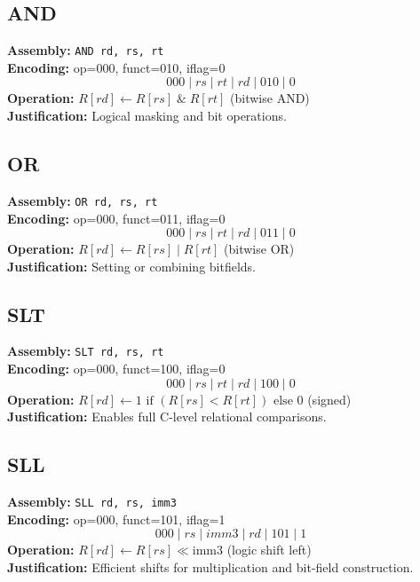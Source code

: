 \documentclass[12pt]{report}
\begin{document}
\subsection*{AND}
\textbf{Assembly:} \texttt{AND rd, rs, rt} \\
\textbf{Encoding:} op=000, funct=010, iflag=0 
\[
000 \;|\; rs \;|\; rt \;|\; rd \;|\; 010 \;|\; 0
\]
\textbf{Operation:} \( R[rd] \leftarrow R[rs] \;\&\; R[rt] \) (bitwise AND)\\
\textbf{Justification:} Logical masking and bit operations.

\vspace{1em}

\subsection*{OR}
\textbf{Assembly:} \texttt{OR rd, rs, rt} \\
\textbf{Encoding:} op=000, funct=011, iflag=0 
\[
000 \;|\; rs \;|\; rt \;|\; rd \;|\; 011 \;|\; 0
\]
\textbf{Operation:} \( R[rd] \leftarrow R[rs] \;|\; R[rt] \) (bitwise OR)\\
\textbf{Justification:} Setting or combining bitfields.

\vspace{1em}

\subsection*{SLT}
\textbf{Assembly:} \texttt{SLT rd, rs, rt} \\
\textbf{Encoding:} op=000, funct=100, iflag=0 
\[
000 \;|\; rs \;|\; rt \;|\; rd \;|\; 100 \;|\; 0
\]
\textbf{Operation:} \( R[rd] \leftarrow 1 \text{ if } (R[rs] < R[rt]) \text{ else } 0 \) (signed) \\
\textbf{Justification:} Enables full C-level relational comparisons.

\vspace{1em}

\subsection*{SLL}
\textbf{Assembly:} \texttt{SLL rd, rs, imm3} \\
\textbf{Encoding:} op=000, funct=101, iflag=1 
\[
000 \;|\; rs \;|\; imm3 \;|\; rd \;|\; 101 \;|\; 1
\]
\textbf{Operation:} \( R[rd] \leftarrow R[rs] \ll \text{imm3} \) (logic shift left) \\
\textbf{Justification:} Efficient shifts for multiplication and bit-field construction.
\end{document}
